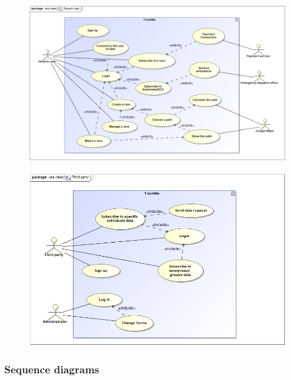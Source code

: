 \begin{figure}[h!] \ContinuedFloat
\centering
\includegraphics[scale=0.5]{sections/diagrams/Generic_user.png} \newline
{}
\end{figure}

\begin{figure}[h!] \ContinuedFloat
\centering
\includegraphics[scale=0.5]{sections/diagrams/Third_Party.png} \newline
{}
\end{figure}

\subsubsection{Sequence diagrams}

